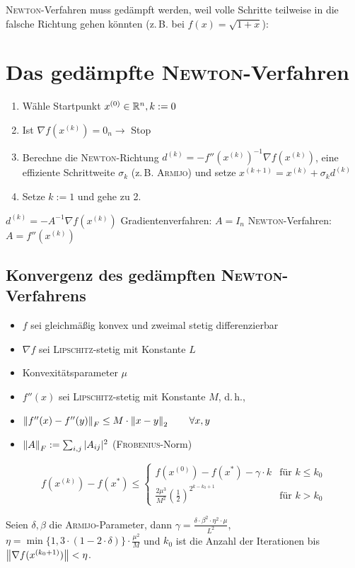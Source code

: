 \textsc{Newton}-Verfahren muss gedämpft werden, weil volle Schritte teilweise
in die falsche Richtung gehen könnten (z.\,B. bei $f(x) = \sqrt{1 + x}$):


\section{Das gedämpfte \textsc{Newton}-Verfahren}
\begin{enumerate}
 \item Wähle Startpunkt $x^{(0)} \in \mathbb R^n, k := 0$
 \item Ist $\nabla f(x^{(k)}) = 0_n \rightarrow$ Stop
 \item Berechne die \textsc{Newton}-Richtung $d^{(k)} = -f''(x^{(k)})^{-1}\nabla f(x^{(k)})$,
 eine effiziente Schrittweite $\sigma_k$ (z.\,B. \textsc{Armijo}) und setze $x^{(k+1)} = x^{(k)} + \sigma_kd^{(k)}$
 \item Setze $k := 1$ und gehe zu 2.
\end{enumerate}

\begin{Bemerkung}
 $d^{(k)} = -A^{-1}\nabla f(x^{(k)})$\newline
 Gradientenverfahren: $A = I_n$\newline
 \textsc{Newton}-Verfahren: $A = f''(x^{(k)})$
\end{Bemerkung}

\subsection{Konvergenz des gedämpften \textsc{Newton}-Verfahrens}
\begin{itemize}
 \item $f$ sei gleichmäßig konvex und zweimal stetig differenzierbar
 \item $\nabla f$ sei \textsc{Lipschitz}-stetig mit Konstante $L$
 \item Konvexitätsparameter $\mu$
 \item $f''(x)$ sei \textsc{Lipschitz}-stetig mit Konstante $M$, d.\,h.,
 \item[] $\left\lVert f''(x) - f''(y)\right\rVert_F \leq M \cdot \left\lVert x - y\right\rVert_2 \qquad \forall x, y$
 \item[] $\left\lVert A\right\rVert_F := \sum_{i, j} |A_{ij}|^2$ (\textsc{Frobenius}-Norm)
\end{itemize}

\begin{Theorem}
 \[
 f(x^{(k)}) - f(x^*) \leq
 \begin{cases}
 f(x^{(0)}) - f(x^*) - \gamma \cdot k & \text{für } k \leq k_0\\
 \frac{2\mu^3}{M^2} \left(\frac{1}{2}\right)^{2^{k - k_0 + 1}} & \text{für } k > k_0
 \end{cases}
 \]

Seien $\delta, \beta$ die \textsc{Armijo}-Parameter, dann
$\gamma = \frac{\delta \cdot \beta^2 \cdot \eta^2 \cdot \mu}{L^2}$,
$\eta = \min \{1, 3 \cdot (1 - 2 \cdot \delta)\} \cdot \frac{\mu^2}{M}$
und $k_0$ ist die Anzahl der Iterationen bis $\left\lVert\nabla f(x^{(k_0 + 1)})\right\rVert < \eta$.
\end{Theorem}

